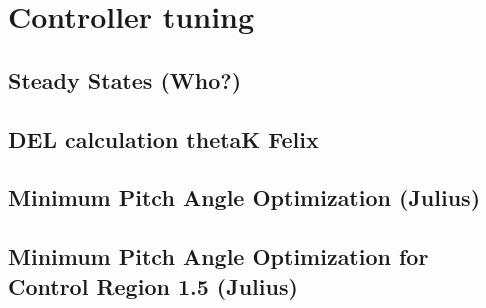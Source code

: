 \chapter{Controller tuning}
\section{Steady States (Who?)} \label{steady states}

\section{DEL calculation thetaK Felix}

\section{Minimum Pitch Angle Optimization (Julius)} \label{minimum pitch angle static}


\section{Minimum Pitch Angle Optimization for Control Region 1.5 (Julius)} 

